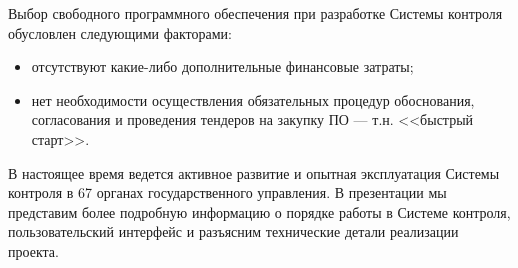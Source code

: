 \documentclass[10pt, a5paper]{article}
\begin{document}
Выбор свободного программного обеспечения при разработке Системы контроля обусловлен следующими факторами:

\begin{itemize}
  \item отсутствуют какие-либо дополнительные финансовые затраты;
  \item нет необходимости осуществления обязательных процедур \linebreak обоснования, согласования и проведения тендеров на закупку ПО --- т.н. <<быстрый старт>>.
\end{itemize}

В настоящее время ведется активное развитие и опытная эксплуатация Системы контроля в 67 органах государственного управления. В презентации мы представим более подробную информацию о порядке работы в Системе контроля, пользовательский интерфейс и разъясним технические детали реализации проекта.
\end{document}
